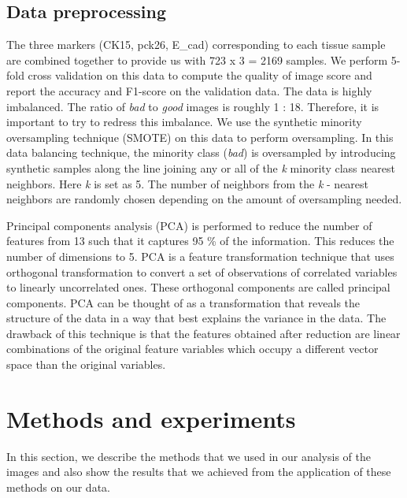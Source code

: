 \subsection{Data preprocessing}
The three markers (CK15, pck26, E\_cad) corresponding to each tissue sample are combined together to provide us with 723 x 3 = 2169 samples. We perform 5-fold cross validation on this data to compute the quality of image score and report the accuracy and F1-score on the validation data.
The data is highly imbalanced. The ratio of \textit{bad} to \textit{good} images is roughly 1 : 18. Therefore, it is important to try to redress this imbalance. We use the synthetic minority oversampling technique (SMOTE) \cite{chawla2002smote} on this data to perform oversampling.  In this data balancing technique, the minority class (\textit{bad}) is oversampled by introducing synthetic samples along the line joining any or all of the \textit{k} minority class nearest neighbors. Here \textit{k} is set as 5. The number of neighbors from the \textit{k} - nearest neighbors are randomly chosen depending on the amount of oversampling needed.

Principal components analysis (PCA) \cite{wold1987principal} is performed to reduce the number of features from 13 such that it captures 95 \% of the information. This reduces the number of dimensions to 5.
PCA is a feature transformation technique that uses orthogonal transformation to convert a set of observations of correlated variables to linearly uncorrelated ones. These orthogonal components are called principal components. PCA can be thought of as a transformation that reveals the structure of the data in a way that best explains the variance in the data. The drawback of this technique is that the features obtained after reduction are linear combinations of the original feature variables which occupy a different vector space than the original variables. 


\section{Methods and experiments}
In this section, we describe the methods that we used in our analysis of the images and also show the results that we achieved from the application of these methods on our data.

